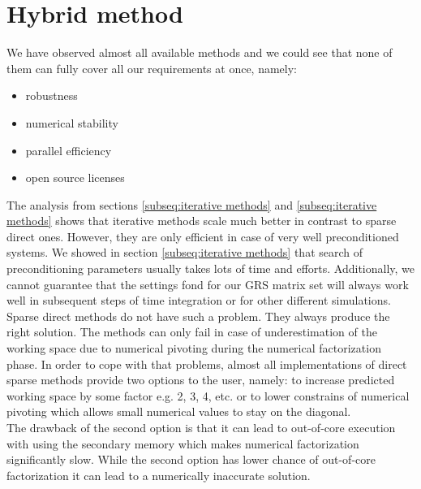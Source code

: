 \section{Hybrid method}
\label{subseq:hybrid-method-description}


We have observed almost all available methods and we could see that none of them can fully cover all our requirements at once, namely:

\begin{itemize}
	\item robustness
	\item numerical stability
	\item parallel efficiency
	\item open source licenses
\end{itemize}


The analysis from sections \ref{subseq:iterative methods} and \ref{subseq:iterative methods} shows that iterative methods scale much better in contrast to sparse direct ones. However, they are only efficient in case of very well preconditioned systems. We showed in section \ref{subseq:iterative methods} that search of preconditioning parameters usually takes lots of time and efforts. Additionally, we cannot guarantee that the settings fond for our GRS matrix set will always work well in subsequent steps of time integration or for other different simulations.\\


Sparse direct methods do not have such a problem. They always produce the right solution. The methods can only fail in case of underestimation of the working space due to numerical pivoting during the numerical factorization phase. In order to cope with that problems, almost all implementations of direct sparse methods provide two options to the user, namely: to increase predicted working space by some factor e.g. 2, 3, 4, etc. or to lower constrains of numerical pivoting which allows small numerical values to stay on the diagonal.\\


The drawback of the second option is that it can lead to out-of-core execution with using the secondary memory which makes numerical factorization significantly slow. While the second option has lower chance of out-of-core factorization it can lead to a numerically inaccurate solution. \\


